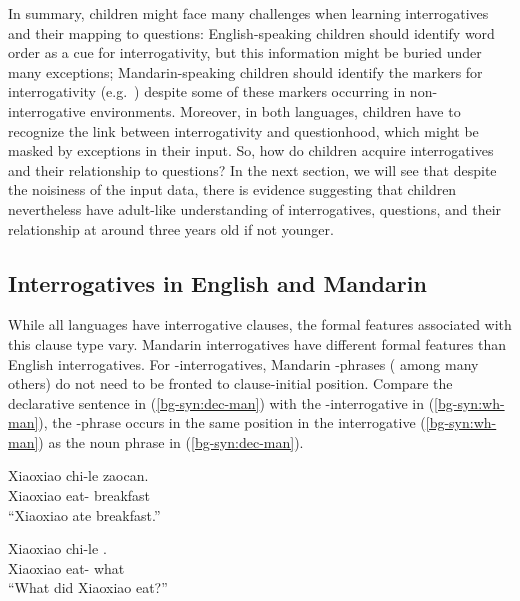 In summary, children might face many challenges when learning interrogatives and their mapping to questions: English-speaking children should identify word order as a cue for interrogativity, but this information might be buried under many exceptions; Mandarin-speaking children should identify the markers for interrogativity (e.g.~\twh{}) despite some of these markers occurring in non-interrogative environments. Moreover, in both languages, children have to recognize the link between interrogativity and questionhood, which might be masked by exceptions in their input. So, how do children acquire interrogatives and their relationship to questions? In the next section, we will see that despite the noisiness of the input data, there is evidence suggesting that children nevertheless have adult-like understanding of interrogatives, questions, and their relationship at around three years old if not younger. 

\subsection{Interrogatives in English and Mandarin}\label{bg:syn}
	
\noindent While all languages have interrogative clauses, the formal features associated with this clause type vary. 
\noindent Mandarin interrogatives have different formal features than English interrogatives. For \twh-interrogatives, Mandarin \twh-phrases (\citealt{huang1982, cheng1991} among many others) do not need to be fronted to clause-initial position. Compare the declarative sentence in (\ref{bg-syn:dec-man}) with the \twh-interrogative in (\ref{bg-syn:wh-man}), the \twh-phrase  occurs in the same position in the interrogative (\ref{bg-syn:wh-man}) as the noun phrase  in (\ref{bg-syn:dec-man}). 


\vspace{-1.5ex} 
\noindent
\begin{minipage}[t]{0.45\linewidth}	
\gll Xiaoxiao	chi-le zaocan.\\
Xiaoxiao eat-\Asp{} breakfast \\
``Xiaoxiao ate breakfast.''
\eex
\end{minipage}
\hspace{0.5cm} %
\begin{minipage}[t]{0.5\linewidth} 
\gll Xiaoxiao	chi-le .\\
Xiaoxiao eat-\Asp{} what \\
``What did Xiaoxiao eat?''
\eex
\end{minipage}
\vspace{0.5ex}

